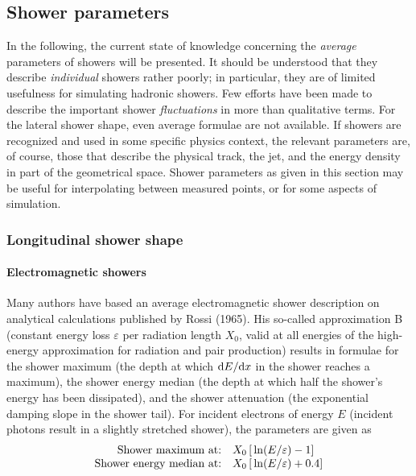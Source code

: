 \subsection{Shower parameters}

In the following, the current state of knowledge concerning the
{\it average\/} parameters of showers will be presented. It should be
understood that they describe {\it individual\/} showers rather
poorly; in particular, they are of limited usefulness for
simulating hadronic showers. Few efforts have been made to describe
the important shower {\it fluctuations\/} in more than qualitative
terms. For the lateral shower shape, even average formulae are not
available. If showers are recognized and used in some specific physics
context, the relevant parameters are, of course, those that describe
the physical track, the jet, and the energy density in part of the
geometrical space. Shower parameters as given in this section may be
useful for interpolating between measured points, or for some aspects
of simulation.

\subsubsection{Longitudinal shower shape}

\paragraph{Electromagnetic showers} Many authors have based
an average electromagnetic shower description on analytical calculations
published by Rossi (1965). His so-called approximation B (constant
energy loss $\varepsilon$ per radiation length $X_0$, valid
at all energies of the high-energy approximation for radiation and
pair production) results in formulae for the shower maximum (the depth
at which ${\rm d}E/{\rm d}x$ in the shower reaches a maximum),
the shower energy median (the depth at which half the shower's energy
has been dissipated), and the shower attenuation (the exponential
damping slope in the shower tail). For incident electrons of energy
$E$ (incident photons result in a slightly stretched shower),
the parameters are given as
\begin{equation} %
\begin{array}[b]{rl}    %
 \hbox{Shower maximum at:} & X_0 \left[\, \ln (E/\varepsilon) - 1 \right] \\
 \hbox{Shower energy median at:} & X_0 \left[\, \ln (E/\varepsilon) +
                0.4\right]
\end{array}
\end{equation}

